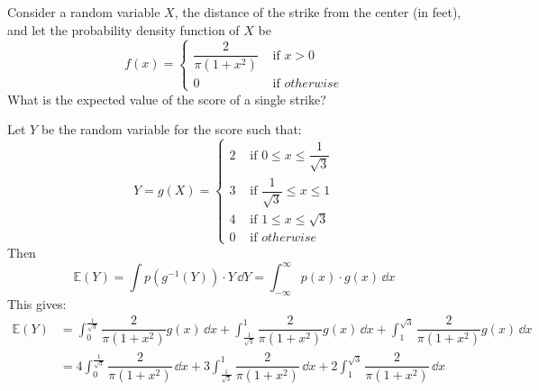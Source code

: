 \documentclass{article}
\begin{document}
    Consider a random variable $X$, the distance of the strike from the center (in feet), and let the probability density function of $X$ be
        \begin{equation*}
            f(x) = \begin{cases}
                \dfrac{2}{\pi(1 + x^{2})} &\text{ if } x > 0 \\
                0 &\text{ if } otherwise                   
            \end{cases}
        \end{equation*}
    What is the expected value of the score of a single strike?
        \begin{answer}
            Let $Y$ be the random variable for the score such that:
                \begin{equation*}
                    Y = g(X) = \begin{cases}
                        2 &\text{ if } 0 \leq x \leq \dfrac{1}{\sqrt{3}} \\
                        3 &\text{ if } \dfrac{1}{\sqrt{3}} \leq x \leq 1 \\
                        4 &\text{ if } 1 \leq x \leq \sqrt{3} \\
                        0 &\text{ if } otherwise   
                    \end{cases}
                \end{equation*}
            Then
                \begin{equation*}
                    \mathbb{E}(Y) = \int p(g^{-1}(Y)) \cdot Y \, \dd{Y}  = \int_{-\infty}^{\infty} p(x) \cdot g(x) \, \dd{x} 
                \end{equation*}
            This gives:
                \begin{align*}
                    \mathbb{E}(Y) &= \int_{0}^{\frac{1}{\sqrt{3}}} \dfrac{2}{\pi(1 + x^{2})}g(x) \, \dd{x} + \int_{\frac{1}{\sqrt{3}}}^{1} \dfrac{2}{\pi(1 + x^{2})}g(x) \, \dd{x} + \int_{1}^{\sqrt{3}} \dfrac{2}{\pi(1 + x^{2})}g(x) \, \dd{x} \\
                                  &= 4\int_{0}^{\frac{1}{\sqrt{3}}} \dfrac{2}{\pi(1 + x^{2})} \, \dd{x} + 3\int_{\frac{1}{\sqrt{3}}}^{1} \dfrac{2}{\pi(1 + x^{2})} \, \dd{x} + 2\int_{1}^{\sqrt{3}} \dfrac{2}{\pi(1 + x^{2})} \, \dd{x} \\
                \end{align*}
        \end{answer}
\end{document}
